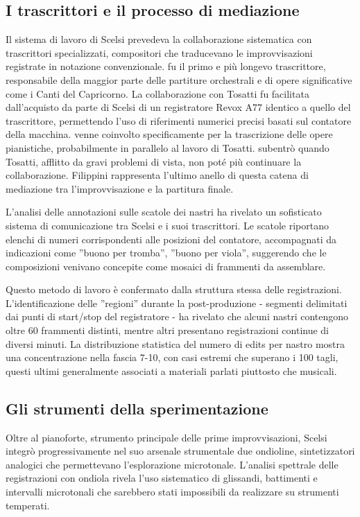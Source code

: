 \subsection{I trascrittori e il processo di mediazione}
Il sistema di lavoro di Scelsi prevedeva la collaborazione sistematica con trascrittori specializzati, compositori che traducevano le improvvisazioni registrate in notazione convenzionale.
 fu il primo e più longevo trascrittore, responsabile della maggior parte delle partiture orchestrali e di opere significative come i Canti del Capricorno. La collaborazione con Tosatti fu facilitata dall'acquisto da parte di Scelsi di un registratore Revox A77 identico a quello del trascrittore, permettendo l'uso di riferimenti numerici precisi basati sul contatore della macchina.  venne coinvolto specificamente per la trascrizione delle opere pianistiche, probabilmente in parallelo al lavoro di Tosatti.  subentrò quando Tosatti, afflitto da gravi problemi di vista, non poté più continuare la collaborazione. Filippini rappresenta l'ultimo anello di questa catena di mediazione tra l'improvvisazione e la partitura finale.

L'analisi delle annotazioni sulle scatole dei nastri ha rivelato un sofisticato sistema di comunicazione tra Scelsi e i suoi trascrittori. Le scatole riportano elenchi di numeri corrispondenti alle posizioni del contatore, accompagnati da indicazioni come ''buono per tromba'', ''buono per viola'', suggerendo che le composizioni venivano concepite come mosaici di frammenti da assemblare.

Questo metodo di lavoro è confermato dalla struttura stessa delle registrazioni. L'identificazione delle ''regioni'' durante la post-produzione - segmenti delimitati dai punti di start/stop del registratore - ha rivelato che alcuni nastri contengono oltre 60 frammenti distinti, mentre altri presentano registrazioni continue di diversi minuti\cite[p. 49]{bernardini_pellegrini_scelsi_2016}. La distribuzione statistica del numero di edits per nastro mostra una concentrazione nella fascia 7-10, con casi estremi che superano i 100 tagli, questi ultimi generalmente associati a materiali parlati piuttosto che musicali\cite[p. 49]{bernardini_pellegrini_scelsi_2016}.
\subsection{Gli strumenti della sperimentazione}
Oltre al pianoforte, strumento principale delle prime improvvisazioni, Scelsi integrò progressivamente nel suo arsenale strumentale due ondioline, sintetizzatori analogici che permettevano l'esplorazione microtonale\cite[p. 177]{bernardini_pellegrini_scelsi_2016}. L'analisi spettrale delle registrazioni con ondiola rivela l'uso sistematico di glissandi, battimenti e intervalli microtonali che sarebbero stati impossibili da realizzare su strumenti temperati.

